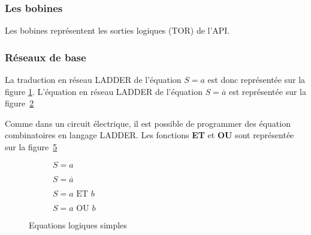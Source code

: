\subsubsection{Les bobines}

Les bobines représentent les sorties logiques (TOR) de l'API.



\subsubsection{Réseaux de base}

La traduction en réseau LADDER de l'équation $S = a$ est donc représentée sur la figure \ref{fig:ladAtoS}. L'équation en réseau LADDER de l'équation $S = \overline{a}$ est représentée sur la figure~\ref{fig:ladABartoS}

Comme dans un circuit électrique, il est possible de programmer des équation combinatoires en langage LADDER. Les fonctions \textbf{ET} et \textbf{OU} sont représentée sur la figure~\ref{fig:equaLogiques}

\begin{figure}[ht]
\begin{subfigure}[b]{.49\textwidth}
\centering
  
  \caption{$S = a$}
  \label{fig:ladAtoS}
\end{subfigure}
%
\begin{subfigure}[b]{.49\textwidth}
\centering
  
  \caption{$S = \overline{a}$}
  \label{fig:ladABartoS}
\end{subfigure}

  \begin{subfigure}[b]{.49\textwidth}
    \centering
    
    \caption{$S = a \text{ ET } b$}
    \label{fig:aETb}
  \end{subfigure}
  \begin{subfigure}[b]{.49\textwidth}
    \centering
    
    \caption{$S = a \text{ OU } b$}
    \label{fig:aOUb}
  \end{subfigure}
  \caption{Equations logiques simples}
  \label{fig:equaLogiques}
\end{figure}
\pagebreak

